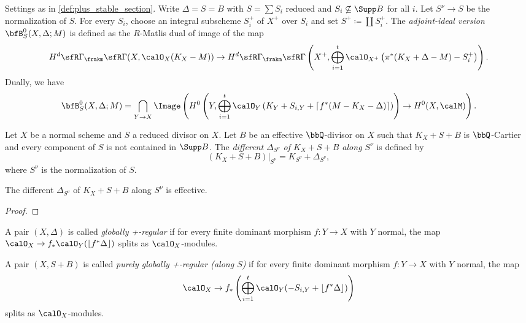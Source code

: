    \begin{definition}\label{def:adjoint_stable_section}
        Settings as in \cref{def:plus_stable_section}.
        Write \(\Delta = S = B\) with \(S=\sum S_i\) reduced and \(S_i \not\subseteq \Supp B\) for all \(i\).
        Let \(S^\nu \to S\) be the normalization of \(S\).
        For every \(S_i\), choose an integral subscheme \(S_i^+\) of \(X^+\) over \(S_i\) and set \(S^+ \coloneqq \coprod S_i^+\).
        The \emph{adjoint-ideal version \(\bfB_S^0(X,\Delta;M)\)} is defined as the \(R\)-Matlis dual of image of the map
        \[ H^d\sfR\Gamma_\frakm\sfR\Gamma(X,\calO_X(K_X - M)) \to H^d\sfR\Gamma_\frakm\sfR\Gamma\left(X^+,\bigoplus_{i=1}^t \calO_{X^+}\left(\pi^*(K_X + \Delta - M)-S_i^+\right)\right). \]
        Dually, we have
        \[ \bfB_S^0(X,\Delta;M) = \bigcap_{Y\to X} \Image\left(H^0\left(Y,\bigoplus_{i=1}^t \calO_Y\left(K_Y + S_{i,Y} + \lceil f^*(M-K_X-\Delta)\rceil\right)\right) \to H^0(X,\calM)\right).\]
    \end{definition}

    \begin{definition}[different]\label{def:different}
        Let \(X\) be a normal scheme and \(S\) a reduced divisor on \(X\).
        Let \(B\) be an effective \(\bbQ\)-divisor on \(X\) such that \(K_X + S + B\) is \(\bbQ\)-Cartier and every component of \(S\) is not contained in \(\Supp B\).
        The \emph{different \(\Delta_{S^\nu}\) of \(K_X+S+B\) along \(S^\nu\)} is defined by 
        \[ (K_X+S+B)|_{S^\nu} = K_{S^\nu} + \Delta_{S^\nu},\]
        where \(S^\nu\) is the normalization of \(S\).
    \end{definition}

    \begin{proposition}\label{prop:different_effective}
        The different \(\Delta_{S^\nu}\) of \(K_X+S+B\) along \(S^\nu\) is effective.
    \end{proposition}
    \begin{proof}
    \end{proof}

    \begin{definition}\label{def:globally_plus_regular_pair}
        A pair \((X,\Delta)\) is called \emph{globally +-regular} if for every finite dominant morphism \(f: Y \to X\) with \(Y\) normal, the map \(\calO_X \to f_*\calO_Y(\lfloor f^*\Delta \rfloor)\) splits as \(\calO_X\)-modules.
    \end{definition}

    \begin{definition}\label{def:purely_globally_plus_regular_pair}
        A pair \((X,S+B)\) is called \emph{purely globally +-regular (along \(S\))} if for every finite dominant morphism \(f: Y \to X\) with \(Y\) normal, the map 
        \[ \calO_X \to f_*\left( \bigoplus_{i=1}^t \calO_Y(-S_{i,Y}+\lfloor f^*\Delta \rfloor) \right)\]
        splits as \(\calO_X\)-modules.
    \end{definition}


